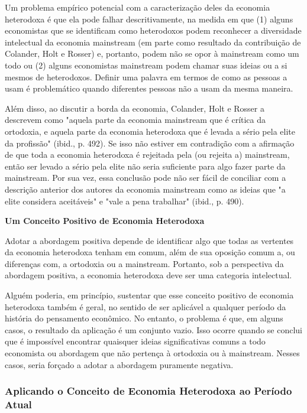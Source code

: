 \documentclass[12pt]{article}
\begin{document}
Um problema empírico potencial com a caracterização deles da economia heterodoxa é que ela pode falhar descritivamente, na medida em que (1) alguns economistas que se identificam como heterodoxos podem reconhecer a diversidade intelectual da economia mainstream (em parte como resultado da contribuição de Colander, Holt e Rosser) e, portanto, podem não se opor à mainstream como um todo ou (2) alguns economistas mainstream podem chamar suas ideias ou a si mesmos de heterodoxos. Definir uma palavra em termos de como as pessoas a usam é problemático quando diferentes pessoas não a usam da mesma maneira.

Além disso, ao discutir a borda da economia, Colander, Holt e Rosser a descrevem como "aquela parte da economia mainstream que é crítica da ortodoxia, e aquela parte da economia heterodoxa que é levada a sério pela elite da profissão" (ibid., p. 492). Se isso não estiver em contradição com a afirmação de que toda a economia heterodoxa é rejeitada pela (ou rejeita a) mainstream, então ser levado a sério pela elite não seria suficiente para algo fazer parte da mainstream. Por sua vez, essa conclusão pode não ser fácil de conciliar com a descrição anterior dos autores da economia mainstream como as ideias que "a elite considera aceitáveis" e "vale a pena trabalhar" (ibid., p. 490).

\textbf{Um Conceito Positivo de Economia Heterodoxa}

Adotar a abordagem positiva depende de identificar algo que todas as vertentes da economia heterodoxa tenham em comum, além de sua oposição comum a, ou diferenças com, a ortodoxia ou a mainstream. Portanto, sob a perspectiva da abordagem positiva, a economia heterodoxa deve ser uma categoria intelectual.

Alguém poderia, em princípio, sustentar que esse conceito positivo de economia heterodoxa também é geral, no sentido de ser aplicável a qualquer período da história do pensamento econômico. No entanto, o problema é que, em alguns casos, o resultado da aplicação é um conjunto vazio. Isso ocorre quando se conclui que é impossível encontrar quaisquer ideias significativas comuns a todo economista ou abordagem que não pertença à ortodoxia ou à mainstream. Nesses casos, seria forçado a adotar a abordagem puramente negativa.

\subsubsection{\textbf{Aplicando o Conceito de Economia Heterodoxa ao Período Atual}}
\end{document}
